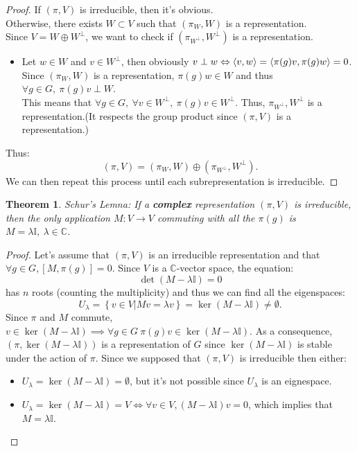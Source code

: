 \documentclass[11pt,a4paper]{article}
\newtheorem*{theorem}{Theorem}
\theoremstyle{definition}
\numberwithin{equation}{section}
\begin{document}
\begin{proof}
    If $(\pi,V)$ is irreducible, then it's obvious.\\
    Otherwise, there exists $W \subset V$ such that $(\pi_W,W)$ is a representation.  \\
    Since $V = W  \oplus W^\perp$, we want to check if $(\pi_{W^\perp},W^\perp)$ is a representation.
    \begin{itemize}
        \item Let $w \in W$ and $v \in W^\perp$, then obviously $v \perp w \Leftrightarrow \expval{v,w} = \expval{\pi(g)v,\pi(g)w}= 0$. Since $(\pi_W,W)$ is a representation, $\pi(g)w \in W$ and thus $\forall g \in G,\ \pi(g)v \perp W $. \\
        This means that $\forall g \in G,\ \forall v \in W^\perp,\ \pi(g)v \in W^\perp$. Thus, $\pi_{W^\perp},W^\perp$ is a representation.(It respects the group product since $(\pi,V)$ is a representation.)
    \end{itemize}
    Thus:\begin{equation*}
        (\pi,V) = (\pi_W,W)\oplus(\pi_{W^\perp},W^\perp).
    \end{equation*}
    We can then repeat this process until each subrepresentation is irreducible.
\end{proof}
\begin{theorem}{Schur's Lemna:}
    If a \textbf{complex} representation $(\pi,V)$ is irreducible, then the only application $M:V\rightarrow V$ commuting with all the $\pi(g)$ is $M = \lambda \mathbb{I},\ \lambda \in \mathbb{C}$. 
\end{theorem}
\begin{proof}
    Let's assume that $(\pi,V)$ is an irreducible representation and that $\forall g \in G, \left[M,\pi(g)\right] = 0$. Since $V$ is a $\mathbb{C}$-vector space, the equation:
    \begin{equation*}
        \det(M-\lambda \mathbb{I}) = 0
    \end{equation*}
    has $n$ roots (counting the multiplicity) and thus we can find all the eigenspaces:
    \begin{equation*}
        U_\lambda = \left\{v\in V | Mv = \lambda v\right\} = \ker\left(M-\lambda \mathbb{I}\right) \neq  \emptyset .
    \end{equation*}
    Since $\pi$ and $M$ commute, $v\in\ker\left(M-\lambda \mathbb{I}\right) \implies  \forall g \in G\ \pi(g)v \in \ker\left(M-\lambda \mathbb{I}\right) $.
    As a consequence, $(\pi,\ker\left(M-\lambda \mathbb{I}\right))$ is a representation of $G$ since $\ker\left(M-\lambda \mathbb{I}\right)$ is stable under the action of $\pi$.
    Since we supposed that $(\pi,V)$ is irreducible then either:
    \begin{itemize}
        \item $U_\lambda = \ker\left(M-\lambda \mathbb{I}\right) = \emptyset$, but it's not possible since $U_\lambda$ is an eignespace.
        \item $U_\lambda = \ker\left(M-\lambda \mathbb{I}\right) = V \Leftrightarrow \forall v \in V, (M-\lambda \mathbb{I})v=0$, which implies that $M = \lambda \mathbb{I}$.
    \end{itemize}
\end{proof}
\end{document}
